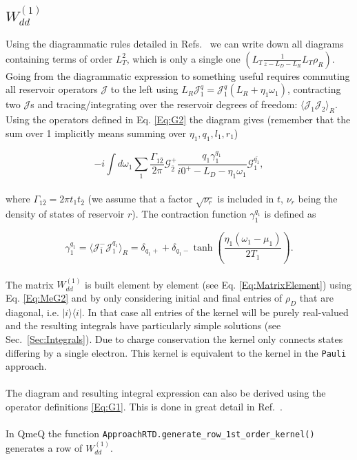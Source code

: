 \documentclass{article}
\newcommand{\oph}[2]{\ensuremath{|#1\rangle\langle#2|}}
\newcommand{\J}{\ensuremath{\mathcal{J}}}
\begin{document}
\subsection{$W^{(1)}_{dd}$}

Using the diagrammatic rules detailed in Refs.~\cite{leijnse2008kinetic, saptsov2012fermionic, gergs2017transport} we can write down all diagrams containing terms of order $L_T^2$, which is only a single one $\left( L_T\frac{1}{z-L_D-L_R}L_T\rho_R\right )$. Going from the diagrammatic expression to something useful requires commuting all reservoir operators $\mathcal{J}$ to the left using $L_R\J_1^q=\J_1^{q}(L_R+\eta_1\omega_1)$, contracting two $\mathcal{J}$s and tracing/integrating over the reservoir degrees of freedom: $\langle \mathcal{J}_1\mathcal{J}_2\rangle_R$. Using the operators defined in Eq. \ref{Eq:G2} the diagram gives (remember that the sum over 1 implicitly means summing over $\eta_1, q_1, l_1, r_1$) \cite{gergs2015charge, gergs2017transport, gergs2018spin}

\begin{equation}
    -i\int d\omega_1\sum_1\frac{\Gamma_{1\bar{2}}}{2\pi}\mathcal{G}_{\bar{2}}^+ \frac{q_1\gamma_1^{q_1}}{i0^+-L_D-\eta_1\omega_1}\mathcal{G}_{1}^{\bar{q_1}},
        \label{Eq:Wdd1}
\end{equation}
\\
where $\Gamma_{1\bar{2}} = 2\pi t_1t_{\bar{2}}$ (we assume that a factor $\sqrt{\nu_r}$ is included in $t$, $\nu_r$ being the density of states of reservoir $r$). The contraction function $\gamma_1^{q_1}$ is defined as 

\begin{equation}
    \gamma_1^{q_1} = \langle \J^-_{\bar{1}}\J^{q_1}_1\rangle_R = \delta_{q_1+} + \delta_{q_1-}\tanh\left ( \frac{\eta_1(\omega_1-\mu_1)}{2T_1} \right ).
\end{equation}
\\
The matrix $W^{(1)}_{dd}$ is built element by element (see Eq. \ref{Eq:MatrixElement}) using Eq. \ref{Eq:MeG2} and by only considering initial and final entries of $\rho_D$ that are diagonal, i.e. $\oph{i}{i}$. In that case all entries of the kernel will be purely real-valued  and the resulting integrals have particularly simple solutions (see Sec.~\ref{Sec:Integrals}). Due to charge conservation the kernel only connects states differing by a single electron. This kernel is equivalent to the kernel in the \verb!Pauli! approach. 
\\
\\
The diagram and resulting integral expression can also be derived using the operator definitions \ref{Eq:G1}. This is done in great detail in Ref.~\cite{leijnse2008kinetic}.
\\
\\
In QmeQ the function \verb!ApproachRTD.generate_row_1st_order_kernel()! generates a row of $W_{dd}^{(1)}$.
\end{document}
